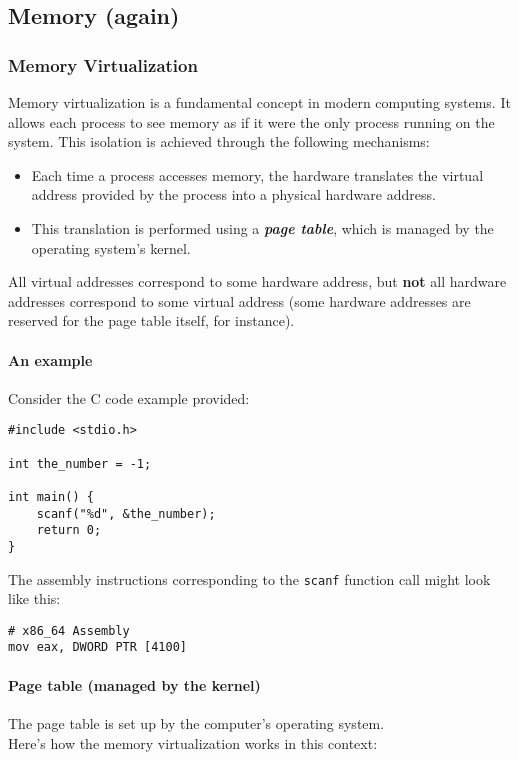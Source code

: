 \documentclass[12pt]{article}
\begin{document}
\subsection{Memory (again)} %
\subsubsection{Memory Virtualization}
Memory virtualization is a fundamental concept in modern computing systems. It allows each process to see memory as if it were the only process running on the system. This isolation is achieved through the following mechanisms:

\begin{itemize}
    \item Each time a process accesses memory, the hardware translates the virtual address provided by the process into a physical hardware address.
    \item This translation is performed using a \textit{\textbf{page table}}, which is managed by the operating system's kernel.
\end{itemize}
All virtual addresses correspond to some hardware address, but \textbf{not} all hardware addresses correspond to some virtual address (some hardware addresses are reserved for the page table itself, for instance).

\paragraph{An example}
Consider the C code example provided:

\begin{lstlisting}
#include <stdio.h>

int the_number = -1;

int main() {
    scanf("%d", &the_number);
    return 0;
}
\end{lstlisting}

The assembly instructions corresponding to the \texttt{scanf} function call might look like this:

\begin{lstlisting}
# x86_64 Assembly
mov eax, DWORD PTR [4100]
\end{lstlisting}

\paragraph{Page table (managed by the kernel)}
The page table is set up by the computer's operating system.\\
Here's how the memory virtualization works in this context:
\end{document}
